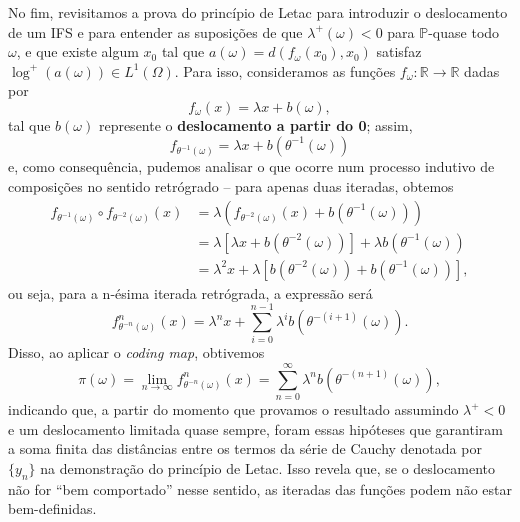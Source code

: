 \documentclass[12pt, a4paper]{article}
\theoremstyle{definition}
\begin{document}
No fim, revisitamos a prova do princípio de Letac para introduzir o deslocamento de um IFS e para entender as suposições de que \(\lambda^{+}(\omega )<0\) para \(\mathbb{P}\)-quase todo \(\omega \), e que existe algum \(x_{0}\) tal que \(a(\omega )=d(f_{\omega }(x_{0}), x_{0})\) satisfaz \(\log^{+}{(a(\omega ))}\in L^{1}(\Omega )\).
Para isso, consideramos as funções \(f_{\omega }:\mathbb{R}\rightarrow \mathbb{R}\) dadas por
\[
	f_{\omega}(x)=\lambda x + b(\omega ),
\]
tal que \(b(\omega )\) represente o \textbf{deslocamento a partir do 0}; assim,
\[
	f_{\theta^{-1}(\omega )} = \lambda x + b(\theta^{-1}(\omega ))
\]
e, como consequência, pudemos analisar o que ocorre num processo indutivo de composições no sentido retrógrado -- para apenas duas iteradas, obtemos
\begin{align*}
	f_{\theta^{-1}(\omega )}\circ f_{\theta^{-2}(\omega )}(x) & = \lambda (f_{\theta^{-2}(\omega )}(x) + b(\theta^{-1}(\omega )))               \\
	                                                          & = \lambda [\lambda x + b(\theta^{-2}(\omega ))]+\lambda b(\theta^{-1}(\omega )) \\
	                                                          & = \lambda^{2}x + \lambda [b(\theta^{-2}(\omega )) + b(\theta^{-1}(\omega ))],
\end{align*}
ou seja, para a n-ésima iterada retrógrada, a expressão será
\[
	f_{\theta^{-n}(\omega )}^{n}(x) = \lambda^{n}x + \sum\limits_{i=0}^{n-1}\lambda^{i}b(\theta^{-(i+1)}(\omega)).
\]
Disso, ao aplicar o \textit{coding map}, obtivemos
\[
	\pi (\omega )=\lim_{n\to \infty}f_{\theta^{-n}(\omega )}^{n}(x)= \sum\limits_{n=0}^{\infty}\lambda^{n}b(\theta^{-(n+1)}(\omega )),
\]
indicando que, a partir do momento que provamos o resultado assumindo \(\lambda^{+}<0\) e um deslocamento limitada quase sempre, foram essas hipóteses que garantiram a soma finita das distâncias entre os termos da série de Cauchy denotada por \(\{y_{n}\}\) na demonstração do princípio de Letac.
Isso revela que, se o deslocamento não for ``bem comportado'' nesse sentido, as iteradas das funções podem não estar bem-definidas.
\end{document}
